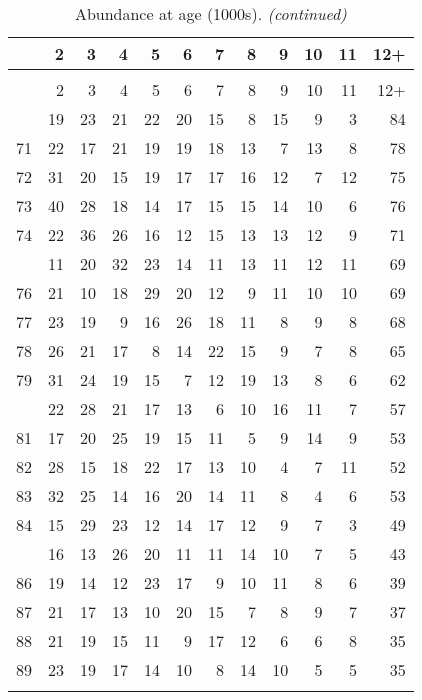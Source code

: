 \documentclass[
]{article}
\begin{document}
\begin{longtable}[t]{lrrrrrrrrrrr}
\caption{\label{tab:NAA-table}Abundance at age (1000s).}\\
\toprule
  & 2 & 3 & 4 & 5 & 6 & 7 & 8 & 9 & 10 & 11 & 12+\\
\midrule
\endfirsthead
\caption[]{Abundance at age (1000s). \textit{(continued)}}\\
\toprule
  & 2 & 3 & 4 & 5 & 6 & 7 & 8 & 9 & 10 & 11 & 12+\\
\midrule
\endhead

\endfoot
\bottomrule
\endlastfoot
70 & 19 & 23 & 21 & 22 & 20 & 15 & 8 & 15 & 9 & 3 & 84\\
71 & 22 & 17 & 21 & 19 & 19 & 18 & 13 & 7 & 13 & 8 & 78\\
72 & 31 & 20 & 15 & 19 & 17 & 17 & 16 & 12 & 7 & 12 & 75\\
73 & 40 & 28 & 18 & 14 & 17 & 15 & 15 & 14 & 10 & 6 & 76\\
74 & 22 & 36 & 26 & 16 & 12 & 15 & 13 & 13 & 12 & 9 & 71\\
\addlinespace
75 & 11 & 20 & 32 & 23 & 14 & 11 & 13 & 11 & 12 & 11 & 69\\
76 & 21 & 10 & 18 & 29 & 20 & 12 & 9 & 11 & 10 & 10 & 69\\
77 & 23 & 19 & 9 & 16 & 26 & 18 & 11 & 8 & 9 & 8 & 68\\
78 & 26 & 21 & 17 & 8 & 14 & 22 & 15 & 9 & 7 & 8 & 65\\
79 & 31 & 24 & 19 & 15 & 7 & 12 & 19 & 13 & 8 & 6 & 62\\
\addlinespace
80 & 22 & 28 & 21 & 17 & 13 & 6 & 10 & 16 & 11 & 7 & 57\\
81 & 17 & 20 & 25 & 19 & 15 & 11 & 5 & 9 & 14 & 9 & 53\\
82 & 28 & 15 & 18 & 22 & 17 & 13 & 10 & 4 & 7 & 11 & 52\\
83 & 32 & 25 & 14 & 16 & 20 & 14 & 11 & 8 & 4 & 6 & 53\\
84 & 15 & 29 & 23 & 12 & 14 & 17 & 12 & 9 & 7 & 3 & 49\\
\addlinespace
85 & 16 & 13 & 26 & 20 & 11 & 11 & 14 & 10 & 7 & 5 & 43\\
86 & 19 & 14 & 12 & 23 & 17 & 9 & 10 & 11 & 8 & 6 & 39\\
87 & 21 & 17 & 13 & 10 & 20 & 15 & 7 & 8 & 9 & 7 & 37\\
88 & 21 & 19 & 15 & 11 & 9 & 17 & 12 & 6 & 6 & 8 & 35\\
89 & 23 & 19 & 17 & 14 & 10 & 8 & 14 & 10 & 5 & 5 & 35\\
\addlinespace

\end{longtable}
\end{document}
